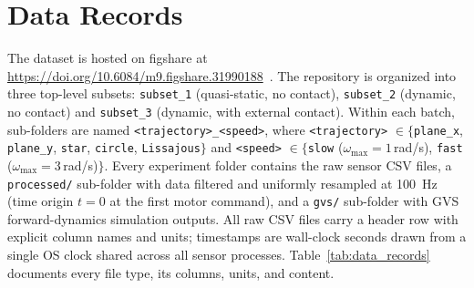 \documentclass[14pt, a4paper]{article}
\begin{document}
\section{Data Records}\label{sec:data_records}

The dataset is hosted on figshare at \url{https://doi.org/10.6084/m9.figshare.31990188}~\cite{Gotelli2026dataset}.
The repository is organized into three top-level subsets: \texttt{subset\_1} (quasi-static, no contact), \texttt{subset\_2} (dynamic, no contact) and \texttt{subset\_3} (dynamic, with external contact).
Within each batch, sub-folders are named \texttt{<trajectory>\_<speed>}, where \texttt{<trajectory>} $\in \{$\texttt{plane\_x}, \texttt{plane\_y}, \texttt{star}, \texttt{circle}, \texttt{Lissajous}$\}$ and \texttt{<speed>} $\in \{$\texttt{slow} ($\omega_{\max} = 1$\,rad/s), \texttt{fast} ($\omega_{\max} = 3$\,rad/s)$\}$.
Every experiment folder contains the raw sensor CSV files, a \texttt{processed/} sub-folder with data filtered and uniformly resampled at \SI{100}{\hertz} (time origin $t = 0$ at the first motor command), and a \texttt{gvs/} sub-folder with GVS forward-dynamics simulation outputs.
All raw CSV files carry a header row with explicit column names and units; timestamps are wall-clock seconds drawn from a single OS clock shared across all sensor processes.
Table~\ref{tab:data_records} documents every file type, its columns, units, and content.
\end{document}
